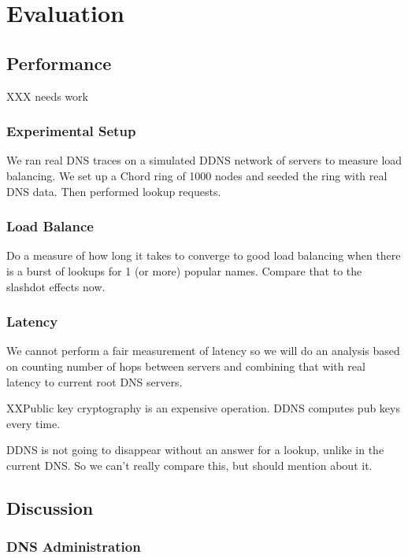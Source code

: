 \section{Evaluation}

\subsection{Performance}

XXX needs work

\subsubsection{Experimental Setup}

We ran real DNS traces on a simulated DDNS network
of servers to measure load balancing. We set up a
Chord ring of 1000 nodes and seeded the ring with 
real DNS data. Then performed lookup requests.

\subsubsection{Load Balance}

Do a measure of how long it takes to converge to good load 
balancing when there is a burst of lookups for 1 (or more)
popular names. Compare that to the slashdot effects now.

\subsubsection{Latency}

We cannot perform a fair measurement of latency so we will do an
analysis based on counting number of hops between servers
and combining that with real latency to current root DNS servers.

XXPublic key cryptography is an expensive operation. 
DDNS computes pub keys every time.

DDNS is not going to disappear without an answer for a lookup,
unlike in the current DNS. So we can't really compare this, but should
mention about it.

\subsection{Discussion}

\subsubsection{DNS Administration}

